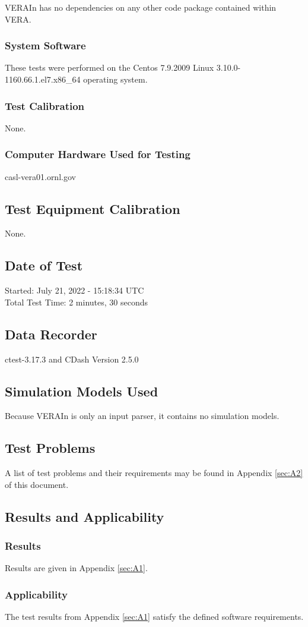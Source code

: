 \documentclass{vera-ornltm}
\begin{document}
VERAIn has no dependencies on any other code package contained within VERA.

\subsubsection{System Software}
These tests were performed on the Centos 7.9.2009 Linux 3.10.0-1160.66.1.el7.x86\_64 operating system.
\subsubsection{Test Calibration}
None.
\subsubsection{Computer Hardware Used for Testing}
casl-vera01.ornl.gov
\subsection{Test Equipment Calibration}
None.
\subsection{Date of Test}
Started: July 21, 2022 - 15:18:34 UTC\\
Total Test Time: 2 minutes, 30 seconds
\subsection{Data Recorder}
ctest-3.17.3 and CDash Version 2.5.0
\subsection{Simulation Models Used}
Because VERAIn is only an input parser, it contains no simulation models.
\subsection{Test Problems}
A list of test problems and their requirements may be found in Appendix \ref{sec:A2} of this document.
\subsection{Results and Applicability}
\subsubsection*{Results}
Results are given in Appendix \ref{sec:A1}.
\subsubsection*{Applicability}
The test results from Appendix \ref{sec:A1} satisfy the defined software requirements. 
\end{document}

